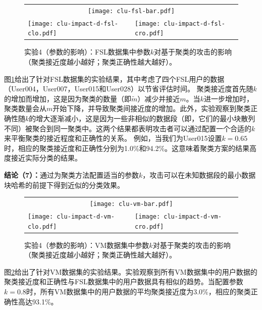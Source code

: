 \begin{figure}[!htbp]
    \centering
    \begin{tabular}{p{.48\linewidth}p{.48\linewidth}}
        \multicolumn{2}{c}{\texttt{[image: clu-fsl-bar.pdf]}}  \\
        \texttt{[image: clu-impact-d-fsl-clo.pdf]} &
        \texttt{[image: clu-impact-d-fsl-cro.pdf]}\\
    \end{tabular}
    \caption{实验4（参数的影响）：FSL数据集中参数$k$对基于聚类的攻击的影响（聚类接近度越小越好；聚类正确性越大越好）。}
    \label{fig:cluster-impact-d-fsl}
\end{figure}

图\ref{fig:cluster-impact-d-fsl}给出了针对FSL数据集的实验结果，其中考虑了四个FSL用户的数据（User004，User007，User015和User028）以节省评估时间。 聚类接近度首先随$k$的增加而增加，这是因为聚类的数量（即$\widetilde{m}$）减少并接近$m$。当$k$进一步增加时，聚类数量会从$m$开始下降，并导致聚类间接近度的增加。此外，实验观察到聚类正确性随$k$的增大逐渐减小，这是因为一些非相似的数据段（即，它们的最小块散列不同）被聚合到同一聚类中。这两个结果都表明攻击者可以通过配置一个合适的$k$来平衡聚类的接近程度和正确性的关系。 例如，当我们为User015设置$k = 0.65$时，相应的聚类接近度和正确性分别为1.0\%和94.2\%。这意味着聚类方案的结果高度接近实际分类的结果。
            
\textbf{结论（7）：}通过为聚类方法配置适当的参数$k$，攻击可以在未知数据段的最小数据块哈希的前提下得到近似的分类效果。

\begin{figure}[!htbp]
    \centering
    \begin{tabular}{p{.48\linewidth}p{.48\linewidth}}
        \multicolumn{2}{c}{\texttt{[image: clu-vm-bar.pdf]}}  \\
        \texttt{[image: clu-impact-d-vm-clo.pdf]} &
        \texttt{[image: clu-impact-d-vm-cro.pdf]}\\
    \end{tabular}
    \caption{实验4（参数的影响）：VM数据集中参数$k$对基于聚类的攻击的影响（聚类接近度越小越好；聚类正确性越大越好）。}
    \label{fig:cluster-impact-d-vm}
\end{figure}

图\ref{fig:cluster-impact-d-vm}给出了针对VM数据集的实验结果。实验观察到所有VM数据集中的用户数据的聚类接近度和正确性与FSL数据集中的用户数据具有相似的趋势。当配置参数$k = 0.8$时，所有VM数据集中的用户数据的平均聚类接近度为3.0\%，相应的聚类正确性高达93.1\%。

